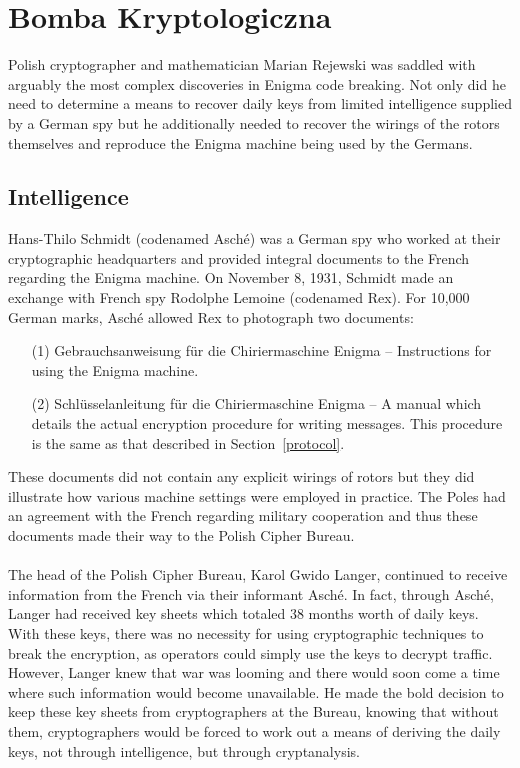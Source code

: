 \chapter{Bomba Kryptologiczna}

Polish cryptographer and mathematician Marian Rejewski was saddled
with arguably the most complex discoveries in
Enigma code breaking. Not only did he need to determine a means to
recover daily keys from limited intelligence supplied by a German spy but he
additionally needed to recover the wirings of the rotors themselves and reproduce the Enigma machine being used by the Germans.

\section{Intelligence}

Hans-Thilo Schmidt (codenamed Asché) was a German spy who worked at
their cryptographic headquarters and provided integral documents to
the French regarding the Enigma machine. On November 8, 1931, Schmidt
made an exchange with French spy Rodolphe Lemoine (codenamed Rex).
For 10,000 German marks,  Asché allowed Rex to photograph two documents:
\begin{itemize}
  \item[(1)] Gebrauchsanweisung für die Chiriermaschine
    Enigma -- Instructions for using the Enigma machine.
  \item[(2)] Schlüsselanleitung für die Chiriermaschine Enigma -- A manual
    which details the actual encryption procedure for writing
    messages. This procedure is the same as that described in
    Section~\ref{protocol}.
\end{itemize}
These documents did not contain any explicit wirings of rotors but
they did illustrate how various machine settings were employed in
practice. The Poles had an agreement with the French regarding
military cooperation and thus these documents made their way to the
Polish Cipher Bureau.
\\\\The head of the Polish Cipher Bureau, Karol Gwido Langer,
continued to receive information from the French via their informant
Asché. In fact, through Asché, Langer had received key sheets which
totaled 38 months worth of daily keys. With these keys, there was no
necessity for using cryptographic techniques to break the encryption,
as operators could simply use the keys to decrypt traffic. However,
Langer knew that war was looming and there would soon come a time where
such information would become unavailable. He made the bold decision
to keep these key sheets from cryptographers at the Bureau, knowing
that without them, cryptographers would be forced to work out a means
of deriving the daily keys, not through intelligence, but through cryptanalysis.
